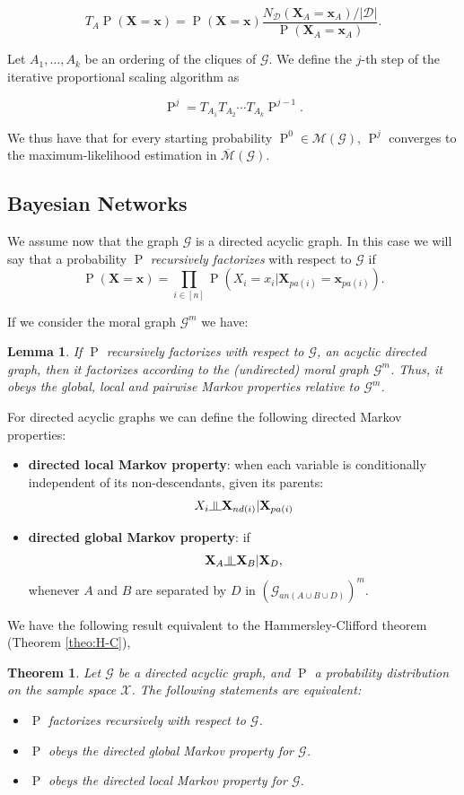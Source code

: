 \documentclass[11pt,a4paper, twoside]{book}
\newtheorem{lemma}{Lemma}[chapter]
\newtheorem{theorem}{Theorem}[chapter]
\newcommand{\indep}{\rotatebox[origin=c]{90}{$\models$}}
\newcommand{\Pp}{\operatorname{P}}
\newcommand{\bx}{\mathbf{x}}
\newcommand{\bX}{\mathbf{X}}
\newcommand{\bchi}{\boldsymbol{\mathcal{X}}}
\begin{document}
$$ T_A\Pp(\bX=\bx) = \Pp(\bX=\bx) \frac{N_{\mathcal{D}}(\bX_A=\bx_A)/|\mathcal{D}|}{\Pp(\bX_A=\bx_A)}.$$

Let $A_1,\ldots,A_k$ be an ordering of the cliques of $\mathcal{G}$. We define the $j$-th step of the iterative proportional scaling algorithm as

$$ \Pp^{j} = T_{A_1}T_{A_2}\cdots T_{A_k} \Pp^{j-1}.$$

We thus have that for every starting probability $\Pp^{0} \in \mathcal{M}(\mathcal{G})$, $\Pp^{j}$ converges to the maximum-likelihood estimation in $\overline{\mathcal{M}}(\mathcal{G})$.

\subsection{Bayesian Networks}

We assume now that the graph $\mathcal{G}$ is a directed acyclic graph. In this case we will say that a probability $\Pp$ \textit{recursively factorizes} with respect to $\mathcal{G}$ if 
$$ \Pp(\bX = \bx) = \prod_{i \in [n]} \Pp(X_i=x_i | \bX_{pa(i)} = \bx_{pa(i)}).$$ 

If we consider the moral graph $\mathcal{G}^m$ we have:

\begin{lemma}
If $\Pp$ recursively factorizes  with respect to $\mathcal{G}$, an acyclic directed graph, then it factorizes according to the (undirected) moral graph $\mathcal{G}^m$. Thus, it obeys the global, local and pairwise Markov properties relative to $\mathcal{G}^m$.
\end{lemma}

For directed acyclic graphs we can define the following directed Markov properties:

\begin{itemize}
\item[(DL)] \textbf{directed local Markov property}: when each variable is conditionally independent of its non-descendants, given its parents:
$$ X_i \indep \bX_{nd(i)} | \bX_{pa(i)} $$
\item[(DG)] \textbf{directed global Markov property}: if 
$$ \bX_A \indep \bX_B | \bX_D ,$$
whenever $A$ and $B$ are separated by $D$ in $\left( \mathcal{G}_{an(A\cup B\cup D)} \right)^m$.
\end{itemize}

We have the following result equivalent to the Hammersley-Clifford theorem (Theorem \ref{theo:H-C}),

\begin{theorem}
\label{theo:H-C-direct}
Let $\mathcal{G}$ be a directed acyclic graph, and $\Pp$ a probability distribution on the sample space $\bchi$. The following statements are equivalent:
\begin{itemize}
\item[(i)] $\Pp$ factorizes recursively with respect to $\mathcal{G}$. 
\item[(ii)] $\Pp$ obeys the directed global Markov property for $\mathcal{G}$.
\item[(iii)] $\Pp$ obeys the directed local Markov property for $\mathcal{G}$.
\end{itemize} 
\end{theorem}
\end{document}
